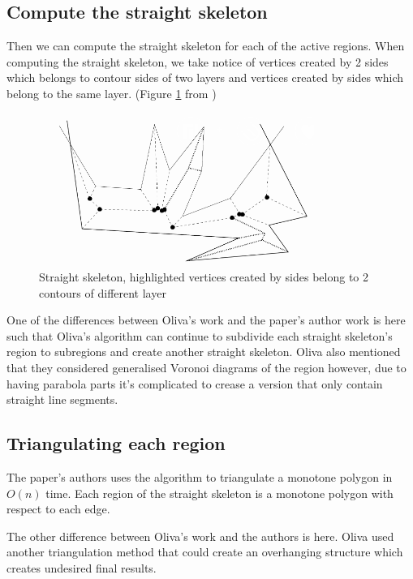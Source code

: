 \documentclass[11pt]{article}
\begin{document}
\subsection{Compute the straight skeleton}

Then we can compute the straight skeleton for each of the active regions. When computing the straight skeleton, we take notice of vertices created by 2 sides which belongs to contour sides of two layers and vertices created by sides which belong to the same layer. (Figure \ref{fig:straight-skeleton} from \cite{barequet04})

\begin{figure}[!h]
    \centering
        \includegraphics[width=0.8\textwidth]{straight-skeleton}
        \caption{Straight skeleton, highlighted vertices created by sides belong to 2 contours of different layer}
        \label{fig:straight-skeleton}
\end{figure}

One of the differences between Oliva's work and the paper's author work is here such that Oliva's algorithm can continue to subdivide each straight skeleton's region to subregions and create another straight skeleton. Oliva also mentioned that they considered generalised Voronoi diagrams of the region however, due to having parabola parts it's complicated to crease a version that only contain straight line segments.

\subsection{Triangulating each region}
The paper's authors uses the algorithm to triangulate a monotone polygon in $O(n)$ time. \cite[p.55~58]{cgaa} Each region of the straight skeleton is a monotone polygon with respect to each edge.

The other difference between Oliva's work and the authors is here. Oliva used another triangulation method that could create an overhanging structure which creates undesired final results.
\end{document}

